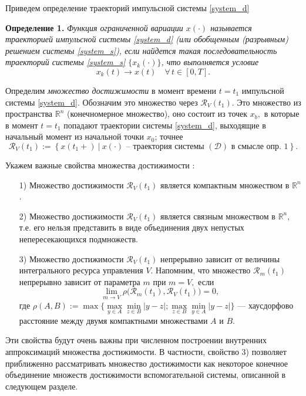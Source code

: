 Приведем определение траекторий импульсной системы \eqref{system_d}

{\bf Определение 1.}
  {\it Функция ограниченной вариации $x(\cdot)$ называется траекторией
  импульсной системы \eqref{system_d} (или обобщенным (разрывным)
  решением системы \eqref{system_s}), если найдется такая последовательность
  траекторий системы \eqref{system_s} $\bigl\{x_k(\cdot)\bigr\}$, что выполняется
  условие 
\begin{equation*}
  x_k(t)\to x(t) \quad  \forall \, t\in [0,T].
\end{equation*}}


Определим \emph{множество достижимости} в момент  времени $t=t_1$
импульсной системы \eqref{system_d}. Обозначим это множество через 
$ {\mathcal R}_V(t_1)$. Это множество из  пространства ${\mathbb R}^n$
(конечномерное  множество), оно состоит из точек $x_b,$ в  которые в
момент $t=t_1$ попадают траектории  системы \eqref{system_d}, выходящие
в начальный  момент из начальной точки $x_0$; точнее
\begin{equation*} 
  {\mathcal R}_V(t_1):=\left\{ x(t_1+) \ \big| \
    x(\cdot) \mbox{ -- траектория системы } ({\mathcal D}) \mbox{ в
      смысле опр. 1} \right\}.
\end{equation*}

Укажем важные свойства множества достижимости \cite{ZS1991, SS2010}:

\begin{itemize}
\item[ 1)] Множество достижимости ${\mathcal R}_V(t_1)$ является
компактным множеством в ${\mathbb R}^n$.
\item[ 2)] Множество достижимости ${\mathcal R}_V(t_1)$ является связным
множеством в ${\mathbb R}^n,$ т.е. его нельзя представить в виде
объединения двух непустых непересекающихся подмножеств.
\item[ 3)] Множество достижимости ${\mathcal R}_V(t_1)$ непрерывно
зависит от величины интегрального ресурса управления $V$. Напомним,
что множество ${\mathcal R}_m(t_1)$ непрерывно зависит от параметра $m$
при $m=V,$ если
\begin{equation*} 
  \lim_{m\to V} \rho\Big( {\mathcal R}_m(t_1) , {\mathcal
    R}_V(t_1) \Big) =0 ,
\end{equation*} где $\rho(A,B):=\max\bigl\{ \max\limits_{y\in
A}\min\limits_{z\in B} |y-z| ; \max\limits_{z\in B}\min\limits_{y\in
A} |y-z| \bigr\}$ --- хаусдорфово расстояние между двумя компактными
множествами $A$ и $B$. 
\end{itemize}

Эти свойства будут очень важны при численном построении внутренних
аппроксимаций множества достижимости.  В частности, свойство 3)
позволяет приближенно рассматривать множество достижимости как
некоторое конечное объединение множеств достижимости вспомогательной
системы, описанной в следующем разделе.

